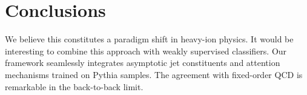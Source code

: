 \section{Conclusions}\label{sec:conclusions}

We believe this constitutes a paradigm shift in heavy-ion physics. It
would be interesting to combine this approach with weakly supervised
classifiers. Our framework seamlessly integrates asymptotic jet
constituents and attention mechanisms trained on Pythia samples. The
agreement with fixed-order QCD is remarkable in the back-to-back limit.

